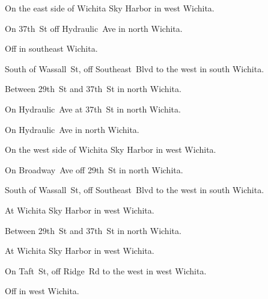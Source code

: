 

\begin{LocationList}

On the east side of Wichita Sky Harbor in west Wichita.

On 37th~St off Hydraulic~Ave in north Wichita.

Off   in southeast Wichita.

South of Wassall~St, off  Southeast~Blvd to the west in south Wichita.

Between 29th~St and 37th~St in north Wichita.

\Location{\GarageHQ \Garage}
On Hydraulic~Ave at 37th~St in north Wichita.

\Location{\GasStation \Gas}
On Hydraulic~Ave in north Wichita.

On the west side of Wichita Sky Harbor in west Wichita.

On Broadway~Ave off 29th~St in north Wichita.

South of Wassall~St, off  Southeast~Blvd to the west in south Wichita.

\Location{\RecruitmentAgency \Recruitment}
At Wichita Sky Harbor in west Wichita.

Between 29th~St and 37th~St in north Wichita.

At Wichita Sky Harbor in west Wichita.

On Taft~St, off Ridge~Rd to the west in west Wichita.

Off   in west Wichita.

\end{LocationList}
